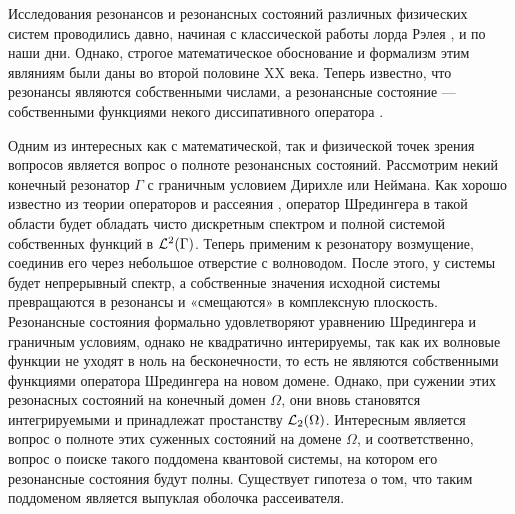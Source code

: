 \startprefacepage

Исследования резонансов и резонансных состояний различных физических систем проводились давно, начиная с классической работы лорда Рэлея \cite{rayleigh1916theory}, и по наши дни. Однако, строгое математическое обоснование и формализм этим являниям были даны во второй половине XX века. Теперь известно, что резонансы являются собственными числами, а резонансные состояние — собственными функциями некого диссипативного оператора \cite{lax1990scattering, adamjan1965class}.

Одним из интересных как с математической, так и физической точек зрения вопросов является вопрос о полноте резонансных состояний. Рассмотрим некий конечный резонатор $\Gamma$ с граничным условием Дирихле или Неймана. Как хорошо известно из теории операторов и рассеяния \cite{reed1980methods}, оператор Шредингера в такой области будет обладать чисто дискретным спектром и полной системой собственных функций в $\mathcal{L}^2(\Gamma)$. Теперь применим к резонатору возмущение, соединив его через небольшое отверстие с волноводом. После этого, у системы будет непрерывный спектр, а собственные значения исходной системы превращаются в резонансы и «смещаются» в комплексную плоскость. Резонансные состояния формально удовлетворяют уравнению Шредингера и граничным условиям, однако не квадратично интерируемы, так как их волновые функции не уходят в ноль на бесконечности, то есть не являются собственными функциями оператора Шредингера на новом домене. Однако, при сужении этих резонасных состояний на конечный домен $\Omega$, они вновь становятся интегрируемыми и принадлежат простанству $\mathcal{L}_2(\Omega)$. Интересным является вопрос о полноте этих суженных состояний на домене $\Omega$, и соответственно, вопрос о поиске такого поддомена квантовой системы, на котором его резонансные состояния будут полны. Существует гипотеза о том, что таким поддоменом является выпуклая оболочка рассеивателя. 


